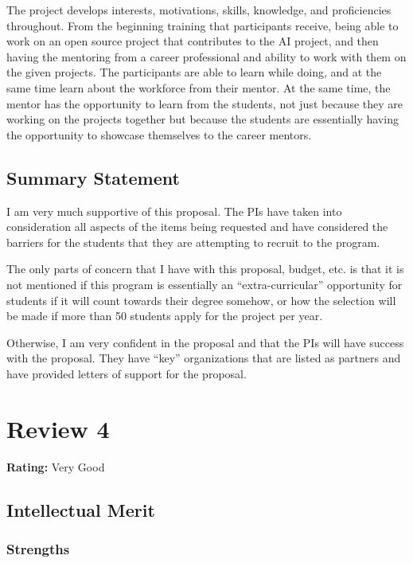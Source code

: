 The project develops interests, motivations, skills, knowledge, and proficiencies throughout. From the beginning training that participants receive, being able to work on an open source project that contributes to the AI project, and then having the mentoring from a career professional and ability to work with them on the given projects. The participants are able to learn while doing, and at the same time learn about the workforce from their mentor. At the same time, the mentor has the opportunity to learn from the students, not just because they are working on the projects together but because the students are essentially having the opportunity to showcase themselves to the career mentors. 

\subsection{Summary Statement} 

I am very much supportive of this proposal. The PIs have taken into consideration all aspects of the items being requested and have considered the barriers for the students that they are attempting to recruit to the program. 

The only parts of concern that I have with this proposal, budget, etc. is that it is not mentioned if this program is essentially an “extra-curricular” opportunity for students if it will count towards their degree somehow, or how the selection will be made if more than 50 students apply for the project per year. 

Otherwise, I am very confident in the proposal and that the PIs will have success with the proposal. They have “key” organizations that are listed as partners and have provided letters of support for the proposal.

\newpage
\section{Review 4}
\textbf{Rating:} Very Good

\subsection{Intellectual Merit}

\subsubsection{Strengths}

